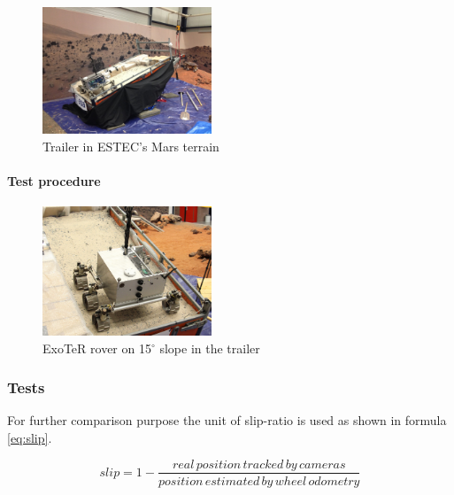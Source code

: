 \documentclass[a4paper,twocolumn]{esapub2005} %
\begin{document}


\begin{figure}[h!]
	\centering		\includegraphics[width=0.45\textwidth]{trailersetup.JPG}	
	\caption{Trailer in ESTEC's Mars terrain}
	\label{fig:trailer}
\end{figure}


\paragraph{Test procedure}



\begin{figure}[h!]
	\centering		\includegraphics[width=0.45\textwidth]{Exoslope.JPG}	
	\caption{ExoTeR rover on 15$^{\circ}$ slope in the trailer}
	\label{fig:Exoslope}
\end{figure}

\subsubsection{Tests}
For further comparison purpose the unit of slip-ratio is used as shown in formula \ref{eq:slip}.

\begin{equation}
    slip = 1- \frac{real\, position\, tracked\, by\, cameras}{position\, estimated\, by\, wheel\, odometry}
		\label{eq:slip}
\end{equation}
\end{document}
